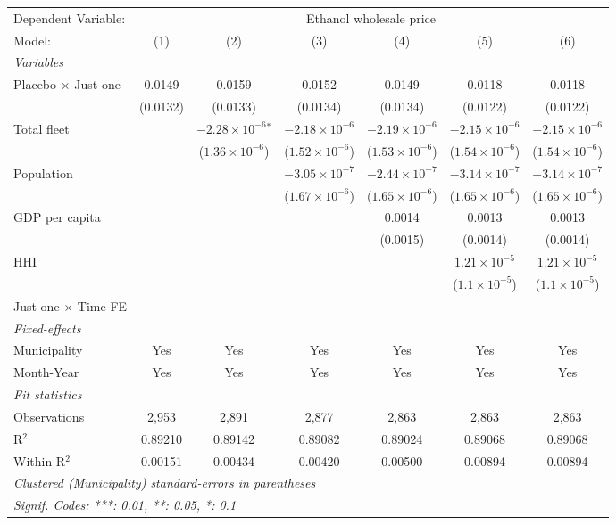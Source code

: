 \documentclass[
]{article}
\begin{document}
\begin{tabular}{lcccccc}
\tabularnewline\midrule\midrule
Dependent Variable:&\multicolumn{6}{c}{Ethanol wholesale price}\\
Model:&(1) & (2) & (3) & (4) & (5) & (6)\\
\midrule \emph{Variables}&   &   &   &   &   &  \\
Placebo $\times $ Just one & 0.0149 & 0.0159 & 0.0152 & 0.0149 & 0.0118 & 0.0118\\
  &(0.0132) & (0.0133) & (0.0134) & (0.0134) & (0.0122) & (0.0122)\\
Total fleet &    & $-2.28\times 10^{-6}$$^{*}$ & $-2.18\times 10^{-6}$ & $-2.19\times 10^{-6}$ & $-2.15\times 10^{-6}$ & $-2.15\times 10^{-6}$\\
  &   & ($1.36\times 10^{-6}$) & ($1.52\times 10^{-6}$) & ($1.53\times 10^{-6}$) & ($1.54\times 10^{-6}$) & ($1.54\times 10^{-6}$)\\
Population &    &    & $-3.05\times 10^{-7}$ & $-2.44\times 10^{-7}$ & $-3.14\times 10^{-7}$ & $-3.14\times 10^{-7}$\\
  &   &    & ($1.67\times 10^{-6}$) & ($1.65\times 10^{-6}$) & ($1.65\times 10^{-6}$) & ($1.65\times 10^{-6}$)\\
GDP per capita &    &    &    & 0.0014 & 0.0013 & 0.0013\\
  &   &    &    & (0.0015) & (0.0014) & (0.0014)\\
HHI &    &    &    &    & $1.21\times 10^{-5}$ & $1.21\times 10^{-5}$\\
  &   &    &    &    & ($1.1\times 10^{-5}$) & ($1.1\times 10^{-5}$)\\
Just one $\times$ Time FE &  &  &  &  &  & \\
\midrule \emph{Fixed-effects}&   &   &   &   &   &  \\
Municipality & Yes & Yes & Yes & Yes & Yes & Yes\\
Month-Year & Yes & Yes & Yes & Yes & Yes & Yes\\
\midrule \emph{Fit statistics}&  & & & & & \\
Observations & 2,953&2,891&2,877&2,863&2,863&2,863\\
R$^2$ & 0.89210&0.89142&0.89082&0.89024&0.89068&0.89068\\
Within R$^2$ & 0.00151&0.00434&0.00420&0.00500&0.00894&0.00894\\
\midrule\midrule\multicolumn{7}{l}{\emph{Clustered (Municipality) standard-errors in parentheses}}\\
\multicolumn{7}{l}{\emph{Signif. Codes: ***: 0.01, **: 0.05, *: 0.1}}\\
\end{tabular}
\end{document}
